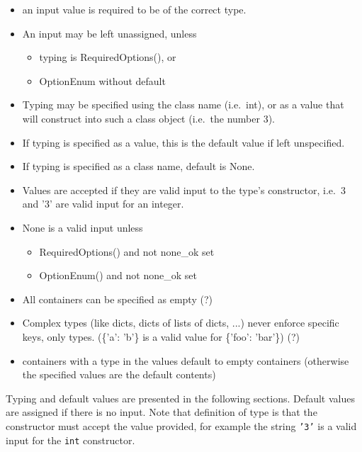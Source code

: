  \begin{itemize}
 \item an input value is required to be of the correct type.

 \item An input may be left unassigned, unless
   \begin{itemize}
   \item typing is RequiredOptions(), or
   \item OptionEnum without default
   \end{itemize}
   
 \item Typing may be specified using the class name (i.e.\ int), or as
   a value that will construct into such a class object (i.e.\ the
   number 3).

 \item If typing is specified as a value, this is the default value if
   left unspecified.

 \item If typing is specified as a class name, default is None.

 \item Values are accepted if they are valid input to the type's
   constructor, i.e.\ 3 and '3' are valid input for an integer.

 \item None is a valid input unless
   \begin{itemize}
   \item RequiredOptions() and not none\_ok set
   \item OptionEnum() and not none\_ok set
   \end{itemize}

 \item All containers can be specified as empty (?)

 \item Complex types (like dicts, dicts of lists of dicts, ...) never
   enforce specific keys, only types. (\{'a': 'b'\} is a valid value
   for \{'foo': 'bar'\}) (?)
   
 \item containers with a type in the values default to empty
   containers (otherwise the specified values are the default contents)

\end{itemize}

Typing and default values are presented in the following sections.
Default values are assigned if there is no input.  Note that
definition of type is that the constructor must accept the value
provided, for example the string \texttt{'3'} is a valid input for the
\texttt{int} constructor.


